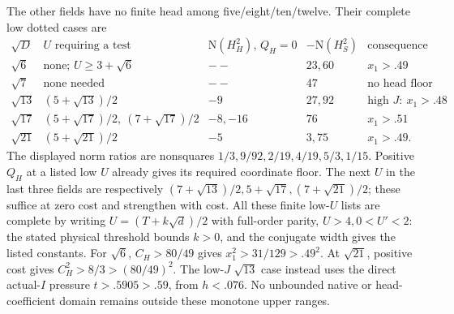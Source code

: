 \documentclass[11pt]{article}
\begin{document}
The other fields have no finite head
among five/eight/ten/twelve.
Their complete low dotted cases are
\[
\begin{array}{c|c|c|c|l}
 \sqrt D&U\text{ requiring a test}&\mathrm N(H_H^2),\,Q_H=0&
                    -\mathrm N(H_S^2)&\text{consequence}\\ \hline
 \sqrt6&\text{none; }U\ge3+\sqrt6&--&23,60&x_1>.49\\
 \sqrt7&\text{none needed}&--&47&\text{no head floor}\\
 \sqrt{13}&(5+\sqrt{13})/2&-9&27,92&
                                  \text{high }J:\ x_1>.48\\
 \sqrt{17}&(5+\sqrt{17})/2,\ (7+\sqrt{17})/2&-8,-16&76&x_1>.51\\
 \sqrt{21}&(5+\sqrt{21})/2&-5&3,75&x_1>.49 .
\end{array}
\]
The displayed norm ratios are nonsquares
\(1/3,9/92,2/19,4/19,5/3,1/15\).
Positive \(Q_H\) at a listed low \(U\)
already gives its required coordinate floor.
The next \(U\) in the last three fields
are respectively
\((7+\sqrt{13})/2,5+\sqrt{17},(7+\sqrt{21})/2\);
these suffice at zero cost and strengthen
with cost.
All these finite low-\(U\) lists are
complete by writing
\(U=(T+k\sqrt d)/2\) with full-order parity,
\(U>4,0<U'<2\): the stated physical
threshold bounds \(k>0\), and the
conjugate width gives the listed constants.
For \(\sqrt6\),
\(C_H>80/49\) gives \(x_1^2>31/129>.49^2\).
At \(\sqrt{21}\), positive cost gives
\(C_H^2>8/3>(80/49)^2\).
The low-\(J\) \(\sqrt{13}\) case instead
uses the direct actual-\(I\) pressure
\(t>.5905>.59\), from \(h<.076\).
No unbounded native or head-coefficient
domain remains outside these monotone
upper ranges.
\end{document}
